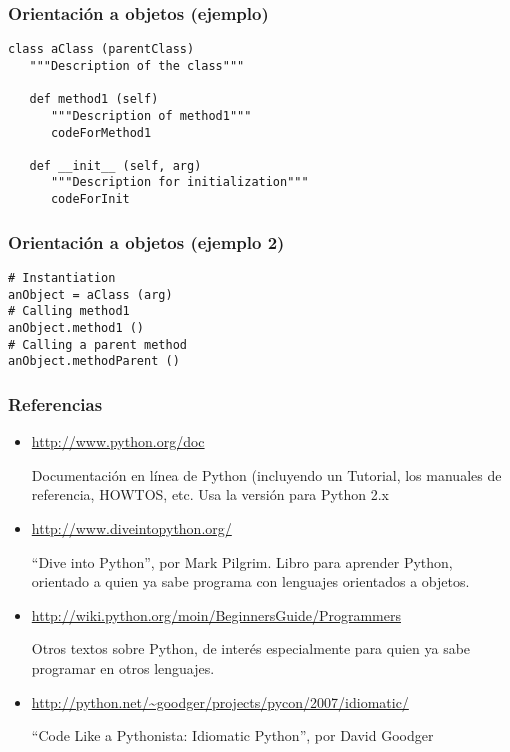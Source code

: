 \begin{frame}[fragile]
\frametitle{Orientación a objetos (ejemplo)}

\begin{verbatim}
class aClass (parentClass)
   """Description of the class"""

   def method1 (self)
      """Description of method1"""
      codeForMethod1

   def __init__ (self, arg)
      """Description for initialization"""
      codeForInit
\end{verbatim}

\end{frame}

\begin{frame}[fragile]
\frametitle{Orientación a objetos (ejemplo 2)}

\begin{verbatim}
# Instantiation
anObject = aClass (arg)
# Calling method1
anObject.method1 ()
# Calling a parent method
anObject.methodParent ()
\end{verbatim}

\end{frame}


\begin{frame}
\frametitle{Referencias}

\begin{itemize}
\item \url{http://www.python.org/doc}

Documentación en línea de Python (incluyendo un Tutorial, los manuales de referencia, HOWTOS, etc. Usa la versión para Python 2.x

\item \url{http://www.diveintopython.org/}

``Dive into Python'', por Mark Pilgrim. Libro para aprender Python, orientado a quien ya sabe programa con lenguajes orientados a objetos.

\item \url{http://wiki.python.org/moin/BeginnersGuide/Programmers}

Otros textos sobre Python, de interés especialmente para quien ya sabe programar en otros lenguajes.

\item \url{http://python.net/~goodger/projects/pycon/2007/idiomatic/}

``Code Like a Pythonista: Idiomatic Python'', por David Goodger
\end{itemize}
\end{frame}


